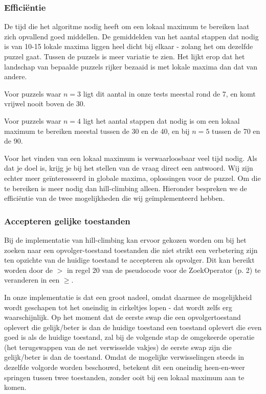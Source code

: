 \documentclass[]{report}
\begin{document}
\subsubsection{Effici\"{e}ntie}
De tijd die het algoritme nodig heeft om een lokaal maximum te bereiken laat zich opvallend goed middellen. De gemiddelden van het aantal stappen dat nodig is van 10-15 lokale maxima liggen heel dicht bij elkaar - zolang het om dezelfde puzzel gaat. Tussen de puzzels is meer variatie te zien. Het lijkt erop dat het landschap van bepaalde puzzels rijker bezaaid is met lokale maxima dan dat van andere.

Voor puzzels waar $n=3$ ligt dit aantal in onze tests meestal rond de 7, en komt vrijwel nooit boven de 30. 

Voor puzzels waar $n=4$ ligt het aantal stappen dat nodig is om een lokaal maximum te bereiken meestal tussen de 30 en de 40, en bij $n=5$ tussen de 70 en de 90.

Voor het vinden van een lokaal maximum is verwaarloosbaar veel tijd nodig. Als dat je doel is, krijg je bij het stellen van de vraag direct een antwoord. Wij zijn echter meer geïnteresseerd in globale maxima, oplossingen voor de puzzel. Om die te bereiken is meer nodig dan hill-climbing alleen. Hieronder bespreken we de effici\"{e}ntie van de twee mogelijkheden die wij ge\"{i}mplementeerd hebben.

\subsubsection{Accepteren gelijke toestanden}
Bij de implementatie van hill-climbing kan ervoor gekozen worden om bij het zoeken naar een opvolger-toestand toestanden die niet strikt een verbetering zijn ten opzichte van de huidige toestand te accepteren als opvolger. Dit kan bereikt worden door de $>$ in regel 20 van de pseudocode voor de ZoekOperator (p. 2) te veranderen in een $\geq$.

In onze implementatie is dat een groot nadeel, omdat daarmee de mogelijkheid wordt geschapen tot het oneindig in cirkeltjes lopen - dat wordt zelfs erg waarschijnlijk. Op het moment dat de eerste swap die een opvolgertoestand oplevert die gelijk/beter is dan de huidige toestand een toestand oplevert die even goed is als de huidige toestand, zal bij de volgende stap de omgekeerde operatie (het terugswappen van de net verwisselde vakjes) de eerste swap zijn die gelijk/beter is dan de toestand. Omdat de mogelijke verwisselingen steeds in dezelfde volgorde worden beschouwd, betekent dit een oneindig heen-en-weer springen tussen twee toestanden, zonder ooit bij een lokaal maximum aan te komen.
\end{document}
